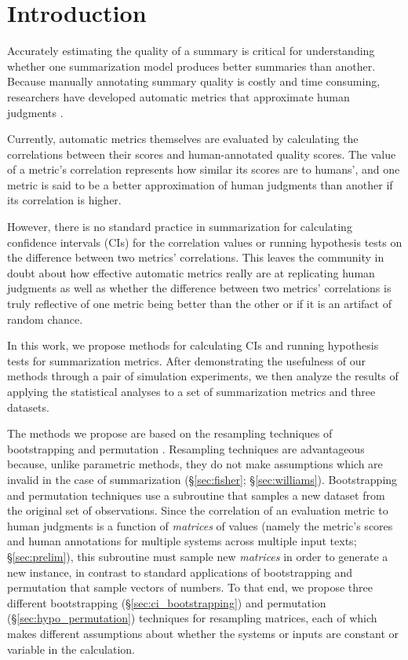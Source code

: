 \section{Introduction}
Accurately estimating the quality of a summary is critical for understanding whether one summarization model produces better summaries than another.
Because manually annotating summary quality is costly and time consuming, researchers have developed automatic metrics that approximate human judgments \citep[][among others]{Lin04,TratzHo08,GKVS08,ZPLGME19,DeutschBeRo20}.

Currently, automatic metrics themselves are evaluated by calculating the correlations between their scores and human-annotated quality scores.
The value of a metric's correlation represents how similar its scores are to humans', and one metric is said to be a better approximation of human judgments than another if its correlation is higher.

However, there is no standard practice in summarization for calculating confidence intervals (CIs) for the correlation values or running hypothesis tests on the difference between two metrics' correlations.
This leaves the community in doubt about how effective automatic metrics really are at replicating human judgments
as well as whether the difference between two metrics' correlations is truly reflective of one metric being better than the other or if it is an artifact of random chance.

In this work, we propose methods for calculating CIs and running hypothesis tests for summarization metrics.
After demonstrating the usefulness of our methods through a pair of simulation experiments, we then analyze the results of applying the statistical analyses to a set of summarization metrics and three datasets.

The methods we propose are based on the resampling techniques of bootstrapping \citep{EfronTi93} and permutation \citep{Noreen89}.
Resampling techniques are advantageous because, unlike parametric methods, they do not make assumptions which are invalid in the case of summarization (\S\ref{sec:fisher}; \S\ref{sec:williams}).
Bootstrapping and permutation techniques use a subroutine that samples a new dataset from the original set of observations.
Since the correlation of an evaluation metric to human judgments is a function of \emph{matrices} of values (namely the metric's scores and human annotations for multiple systems across multiple input texts; \S\ref{sec:prelim}), this subroutine must sample new \emph{matrices} in order to generate a new instance, in contrast to standard applications of bootstrapping and permutation that sample vectors of numbers. %
To that end, we propose three different bootstrapping (\S\ref{sec:ci_bootstrapping}) and permutation (\S\ref{sec:hypo_permutation}) techniques for resampling matrices, each of which makes different assumptions about whether the systems or inputs are constant or variable in the calculation.

